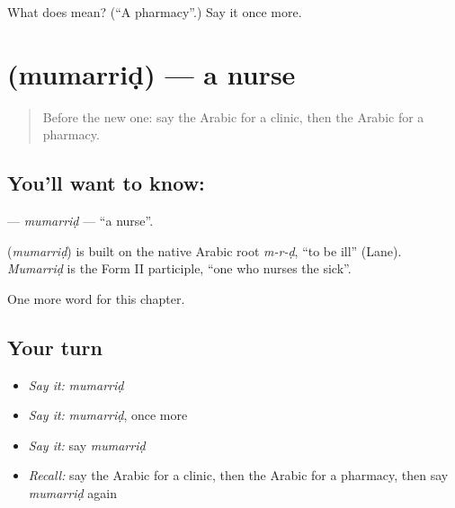 \begin{tcolorbox}[breakable,colback=teal!4,colframe=teal!35!black,title={Before you move on}]
What does  mean? (\textquotedblleft{}A pharmacy\textquotedblright{}.) Say it once more.
\end{tcolorbox}
\section[\texorpdfstring{\ar{ممرض} (mumarriḍ)}{ممرض (mumarriḍ)}]{ (mumarriḍ) — a nurse}

\label{lesson:AR-C231-mumarrid}



\begin{quote}
Before the new one: say the Arabic for a clinic, then the Arabic for a pharmacy.
\end{quote}

\subsection*{You'll want to know: }
\textbf{} — \emph{mumarriḍ} — \textquotedblleft{}a nurse\textquotedblright{}.

\begin{cousinweb}
\textbf{} (\emph{mumarriḍ}) is built on the native Arabic root \emph{m-r-ḍ}, \textquotedblleft{}to be ill\textquotedblright{} (Lane). \emph{Mumarriḍ} is the Form II participle, \textquotedblleft{}one who nurses the sick\textquotedblright{}.
\end{cousinweb}

\begin{grammarlens}[title={What you've built}]
One more word for this chapter.
\end{grammarlens}

\subsection*{Your turn}
\begin{itemize}
\raggedright
  \item \emph{Say it:} \emph{mumarriḍ}
  \item \emph{Say it:} \emph{mumarriḍ}, once more
  \item \emph{Say it:} say \emph{mumarriḍ}
  \item \emph{Recall:} say the Arabic for a clinic, then the Arabic for a pharmacy, then say \emph{mumarriḍ} again
\end{itemize}

